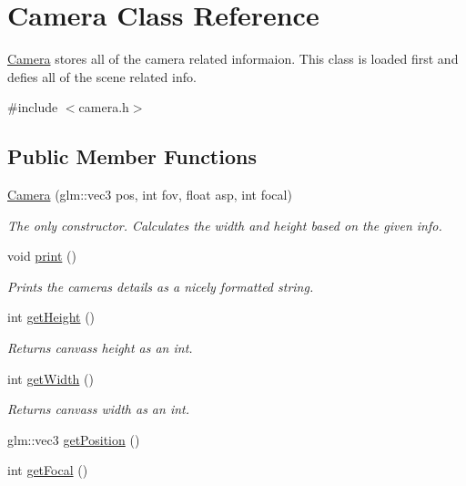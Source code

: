 \hypertarget{class_camera}{}\section{Camera Class Reference}
\label{class_camera}


\mbox{\hyperlink{class_camera}{Camera}} stores all of the camera related informaion. This class is loaded first and defies all of the scene related info.  




{\ttfamily \#include $<$camera.\+h$>$}

\subsection*{Public Member Functions}
\begin{DoxyCompactItemize}
\item 
\mbox{\hyperlink{class_camera_a650299ece1e549c512df12164a5a0e9a}{Camera}} (glm\+::vec3 pos, int fov, float asp, int focal)
\begin{DoxyCompactList}\small\item\em The only constructor. Calculates the width and height based on the given info. \end{DoxyCompactList}\item 
void \mbox{\hyperlink{class_camera_a905d2a0f8677aaad1ee17eb2a842efe5}{print}} ()
\begin{DoxyCompactList}\small\item\em Prints the camera\textquotesingle{}s details as a nicely formatted string. \end{DoxyCompactList}\item 
int \mbox{\hyperlink{class_camera_a315be9ee1238abddce9a580430ad403a}{get\+Height}} ()
\begin{DoxyCompactList}\small\item\em Returns canvas\textquotesingle{}s height as an int. \end{DoxyCompactList}\item 
int \mbox{\hyperlink{class_camera_a1122b43b7db5e69e9d6e187b74a6ec7e}{get\+Width}} ()
\begin{DoxyCompactList}\small\item\em Returns canvas\textquotesingle{}s width as an int. \end{DoxyCompactList}\item 
glm\+::vec3 \mbox{\hyperlink{class_camera_a520c5a7413b3e704f2f442288db17bcf}{get\+Position}} ()
\item 
int \mbox{\hyperlink{class_camera_a5045b4557d3cd7cd4c64c49f5a693aa5}{get\+Focal}} ()
\end{DoxyCompactItemize}


